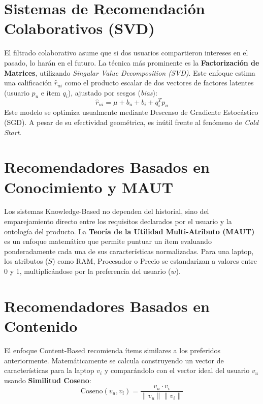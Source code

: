 \documentclass[12pt,a4paper]{report}
\begin{document}
\section{Sistemas de Recomendación Colaborativos (SVD)}
El filtrado colaborativo asume que si dos usuarios compartieron intereses en el pasado, lo harán en el futuro. La técnica más prominente es la \textbf{Factorización de Matrices}, utilizando \textit{Singular Value Decomposition (SVD)}. Este enfoque estima una calificación $\hat{r}_{ui}$ como el producto escalar de dos vectores de factores latentes (usuario $p_u$ e ítem $q_i$), ajustado por sesgos (\textit{bias}):
\begin{equation}
    \hat{r}_{ui} = \mu + b_u + b_i + q_i^T p_u
\end{equation}
Este modelo se optimiza usualmente mediante Descenso de Gradiente Estocástico (SGD). A pesar de su efectividad geométrica, es inútil frente al fenómeno de \textit{Cold Start}.

\section{Recomendadores Basados en Conocimiento y MAUT}
Los sistemas Knowledge-Based no dependen del historial, sino del emparejamiento directo entre los requisitos declarados por el usuario y la ontología del producto. La \textbf{Teoría de la Utilidad Multi-Atributo (MAUT)} es un enfoque matemático que permite puntuar un ítem evaluando ponderadamente cada una de sus características normalizadas. Para una laptop, los atributos ($S$) como RAM, Procesador o Precio se estandarizan a valores entre 0 y 1, multiplicándose por la preferencia del usuario ($w$).

\section{Recomendadores Basados en Contenido}
El enfoque Content-Based recomienda ítems similares a los preferidos anteriormente. Matemáticamente se calcula construyendo un vector de características para la laptop $v_i$ y comparándolo con el vector ideal del usuario $v_u$ usando \textbf{Similitud Coseno}:
\begin{equation}
    \text{Coseno}(v_u, v_i) = \frac{v_u \cdot v_i}{\|v_u\| \|v_i\|}
\end{equation}

\end{document}
